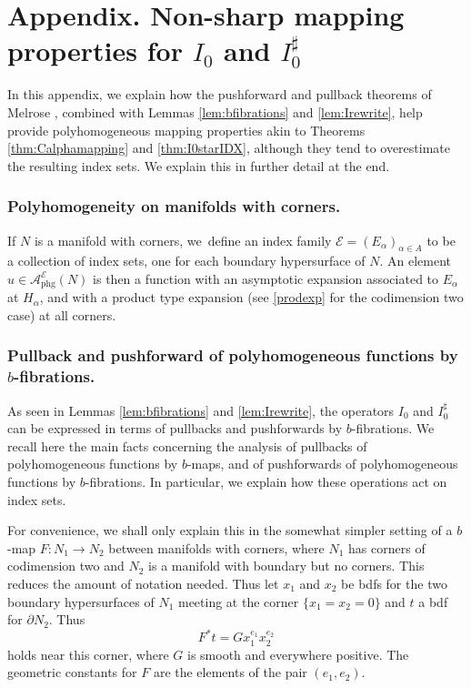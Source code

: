 \documentclass[11pt]{article}
\theoremstyle{plain}
\theoremstyle{definition}
\theoremstyle{remark}
\def\A{\mathcal{A}}
\newcommand{\calE}{\mathcal E}
\newcommand{\adj}{I_0^\sharp}
\newcommand{\del}{\partial}
\begin{document}
\appendix

\section*{Appendix. Non-sharp mapping properties for \texorpdfstring{$I_0$ and $\adj$}{adj}}\label{sec:PFT}

In this appendix, we explain how the pushforward and pullback theorems of Melrose \cite{Melrose1992}, combined with Lemmas \ref{lem:bfibrations} and \ref{lem:Irewrite}, help provide polyhomogeneous mapping properties akin to Theorems \ref{thm:Calphamapping} and \ref{thm:I0starIDX}, although they tend to overestimate the resulting index sets. We explain this in further detail at the end.

\subsubsection*{Polyhomogeneity on manifolds with corners.} If $N$ is a manifold with corners, we~defi\-ne an index family $\calE = (E_\alpha)_{\alpha \in A}$ to be a collection of index sets, one for each boundary hypersurface of $N$. An element $u \in \A^{\calE}_{\mathrm{phg}}(N)$ is then a function with an asymptotic expansion associated to $E_\alpha$ at $H_\alpha$, and with a product type expansion (see \eqref{prodexp} for the codimension two case) at all corners.

\subsubsection*{Pullback and pushforward of polyhomogeneous functions by $b$-fibrations.} As seen in Lemmas \ref{lem:bfibrations} and \ref{lem:Irewrite}, the operators $I_0$ and $\adj$ can be expressed in terms of pullbacks and pushforwards by $b$-fibrations. We recall here the main facts concerning the analysis of pullbacks of polyhomogeneous functions by $b$-maps, and of pushforwards of polyhomogeneous functions by $b$-fibrations. In particular, we explain how these operations act on index sets.

For convenience, we shall only explain this in the somewhat simpler setting of a $b$-map $F\colon N_1 \to N_2$ between manifolds with corners, where $N_1$ has corners of codimension two and $N_2$ is a manifold with boundary but no corners. This reduces the amount of notation needed. Thus let $x_1$ and $x_2$ be bdfs for the two boundary hypersurfaces of $N_1$ meeting at the corner $\{x_1 = x_2 = 0\}$ and $t$ a bdf for $\del N_2$. Thus
\[
F^* t = G x_1^{e_1} x_2^{e_2}
\]
holds near this corner, where $G$ is smooth and everywhere positive. The geometric constants for $F$ are the elements of the pair $(e_1, e_2)$.
\end{document}
